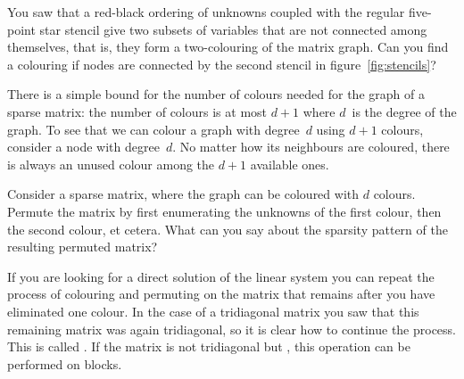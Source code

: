 \begin{exercise}
  You saw that a red-black ordering of unknowns
  coupled with the regular five-point star stencil give two subsets of
  variables that are not connected among themselves, that is, 
  they form a two-colouring of the matrix graph. 
  Can you find a colouring if nodes are connected by the second stencil in
  figure~\ref{fig:stencils}?
\end{exercise}


There is a simple bound for the number of colours needed for the graph
of a sparse matrix: the number of colours is at most $d+1$ where
$d$~is the degree of the graph. To see that we can colour a graph with
degree~$d$ using $d+1$ colours, consider a node with
degree~$d$. No matter how its neighbours are coloured, there is always
an unused colour among the $d+1$ available ones.

\begin{exercise}
  Consider a sparse matrix, where the graph can be coloured with $d$
  colours. Permute the matrix by first enumerating the unknowns of the
  first colour,
  then the second colour, et cetera. What can you say about the
  sparsity pattern of the resulting permuted matrix?
\end{exercise}

If you
are looking for a direct solution of the linear system you can repeat
the process of colouring and permuting on the matrix that remains
after you have eliminated one colour. In the case of a tridiagonal
matrix you saw that this remaining matrix was again tridiagonal, so
it is clear how to continue the process. This is called
. If the matrix is not tridiagonal but
, this operation can be performed on
blocks.

